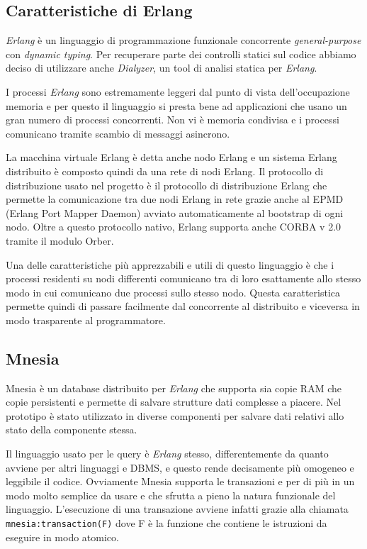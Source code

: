 \documentclass[11pt,a4paper]{report}
\newcommand{\fun}[1]{\texttt{#1}}
\begin{document}
\subsection*{Caratteristiche di Erlang}
\textit{Erlang} è un linguaggio di programmazione funzionale concorrente \textit{general-purpose} con \textit{dynamic typing}. Per recuperare parte dei controlli statici sul codice abbiamo deciso di utilizzare anche \textit{Dialyzer}, un tool di analisi statica per \textit{Erlang}.

I processi \textit{Erlang} sono estremamente leggeri dal punto di vista dell'occupazione memoria e per questo il linguaggio si presta bene ad applicazioni che usano un gran numero di processi concorrenti. Non vi è memoria condivisa e i processi comunicano tramite scambio di messaggi asincrono.

La macchina virtuale Erlang è detta anche nodo Erlang e un sistema Erlang distribuito è composto quindi da una rete di nodi Erlang. Il protocollo di distribuzione usato nel progetto è il protocollo di distribuzione Erlang che permette la comunicazione tra due nodi Erlang in rete grazie anche al EPMD (Erlang Port Mapper Daemon) avviato automaticamente al bootstrap di ogni nodo. Oltre a questo protocollo nativo, Erlang supporta anche CORBA v 2.0 tramite il modulo Orber.

Una delle caratteristiche più apprezzabili e utili di questo linguaggio è che i processi residenti su nodi differenti comunicano tra di loro esattamente allo stesso modo in cui comunicano due processi sullo stesso nodo. Questa caratteristica permette quindi di passare facilmente dal concorrente al distribuito e viceversa in modo trasparente al programmatore.
\subsection*{Mnesia}
Mnesia è un database distribuito per \textit{Erlang} che supporta sia copie RAM che copie persistenti e permette di salvare strutture dati complesse a piacere. Nel prototipo è stato utilizzato in diverse componenti per salvare dati relativi allo stato della componente stessa.

Il linguaggio usato per le query è \textit{Erlang} stesso, differentemente da quanto avviene per altri linguaggi e DBMS, e questo rende decisamente più omogeneo e leggibile il codice. Ovviamente Mnesia supporta le transazioni e per di più in un modo molto semplice da usare e che sfrutta a pieno la natura funzionale del linguaggio. L'esecuzione di una transazione avviene infatti grazie alla chiamata \fun{mnesia:transaction(F)} dove F è la funzione che contiene le istruzioni da eseguire in modo atomico.
\end{document}
